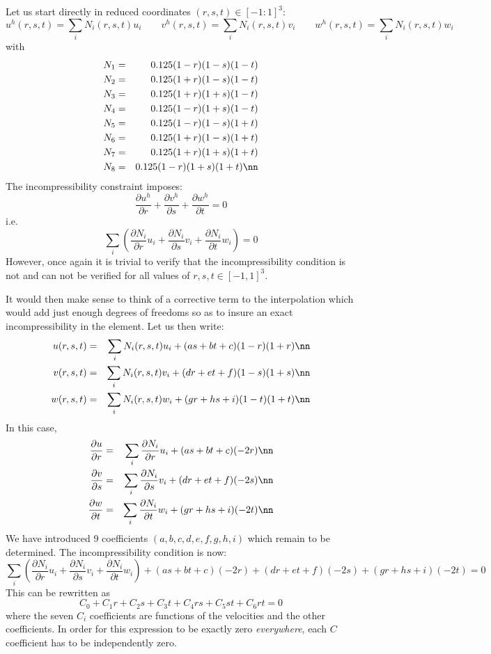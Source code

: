 Let us start directly in reduced coordinates $(r,s,t)\in [-1:1]^3$:
\[
u^h(r,s,t)=\sum_i N_i(r,s,t) u_i
\quad
\quad
v^h(r,s,t)=\sum_i N_i(r,s,t) v_i
\quad
\quad
w^h(r,s,t)=\sum_i N_i(r,s,t) w_i
\]
with
\begin{eqnarray}
N_1&=&0.125(1-r)(1-s)(1-t) \nonumber\\ 
N_2&=&0.125(1+r)(1-s)(1-t)  \nonumber\\ 
N_3&=&0.125(1+r)(1+s)(1-t)  \nonumber\\ 
N_4&=&0.125(1-r)(1+s)(1-t)  \nonumber\\ 
N_5&=&0.125(1-r)(1-s)(1+t)  \nonumber\\ 
N_6&=&0.125(1+r)(1-s)(1+t)  \nonumber\\ 
N_7&=&0.125(1+r)(1+s)(1+t)  \nonumber\\ 
N_8&=&0.125(1-r)(1+s)(1+t)  \nn
\end{eqnarray}
The incompressibility constraint imposes:
\[
\frac{\partial u^h}{\partial r}+
\frac{\partial v^h}{\partial s}+
\frac{\partial w^h}{\partial t}=0
\]
i.e.
\[
\sum_i \left(  
\frac{\partial N_i}{\partial r} u_i+
\frac{\partial N_i}{\partial s} v_i+
\frac{\partial N_i}{\partial t} w_i
\right)
=0
\]
However, once again it is trivial to verify that the incompressibility
condition is not and can not be verified for all values of
$r,s,t \in [-1,1]^3$.


It would then make sense to think of a corrective term to the interpolation
which would add just enough degrees of freedoms so as to insure an exact
incompressibility in the element.
Let us then write:
\begin{eqnarray}
u(r,s,t)&=&\sum_i N_i(r,s,t) u_i + (a s + b t +c)(1-r)(1+r) \nn\\
v(r,s,t)&=&\sum_i N_i(r,s,t) v_i + (d r + e t +f)(1-s)(1+s) \nn\\
w(r,s,t)&=&\sum_i N_i(r,s,t) w_i + (g r + h s +i)(1-t)(1+t) \nn
\end{eqnarray}
In this case,
\begin{eqnarray}
\frac{\partial u}{\partial r}&=&\sum_i \frac{\partial N_i}{\partial r} u_i + (a s + b t +c)(-2r)\nn\\
\frac{\partial v}{\partial s}&=&\sum_i \frac{\partial N_i}{\partial s} v_i + (d r + e t +f)(-2s)\nn\\
\frac{\partial w}{\partial t}&=&\sum_i \frac{\partial N_i}{\partial t} w_i + (g r + h s +i)(-2t)\nn
\end{eqnarray}
We have introduced 9 coefficients  $(a,b,c,d,e,f,g,h,i)$ which remain to be determined.
The incompressibility condition is now:
\[
\sum_i \left(  
\frac{\partial N_i}{\partial r} u_i+
\frac{\partial N_i}{\partial s} v_i+
\frac{\partial N_i}{\partial t} w_i
\right)
+ (a s + b t +c) (-2r) + (d r + e t +f)(-2s) + (g r + h s +i)(-2t) 
=0
\]
This can be rewritten as
\[
C_0  + C_1 r + C_2 s + C_3 t + C_4 rs + C_5 st + C_6 rt = 0
\]
where the seven $C_i$ coefficients are functions of the velocities and the other coefficients.
In order for this expression to be exactly zero {\it everywhere}, each $C$ coefficient has
to be independently zero.

